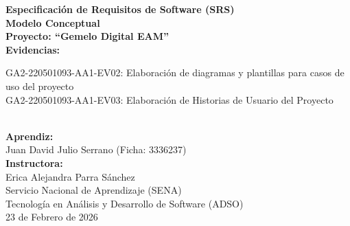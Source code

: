 \documentclass[12pt, a4paper]{article} %
\begin{document}
\begin{titlepage}
    \begin{center}
        \vspace*{2cm}
        {\Huge \bfseries Especificación de Requisitos de Software (SRS) \\ \small Modelo Conceptual}\\[1cm]
        {\Large \bfseries Proyecto: ``Gemelo Digital EAM''}\\[2cm]
        
        {\large \bfseries Evidencias:}\\[0.5cm]
        \begin{minipage}{0.8\textwidth}
        \centering
        \large{GA2-220501093-AA1-EV02: Elaboración de diagramas y plantillas para casos de uso del proyecto} \\[0.3cm]
        \large{GA2-220501093-AA1-EV03: Elaboración de Historias de Usuario del Proyecto}\\
        \end{minipage}\\[1.5cm]

        {\large \bfseries Aprendiz:}\\[0.5cm]
        \large{Juan David Julio Serrano (Ficha: 3336237)}\\[1.5cm]
        
        {\large \bfseries Instructora:}\\[0.5cm]
        \large{Erica Alejandra Parra Sánchez}\\[1.5cm]
        
        \vfill
        \large{Servicio Nacional de Aprendizaje (SENA)}\\[0.3cm]
        \large{Tecnología en Análisis y Desarrollo de Software (ADSO)}\\[0.3cm]
        \large{23 de Febrero de 2026}
    \end{center}
\end{titlepage}

\clearpage
{}
\tableofcontents
\clearpage














\end{document}
